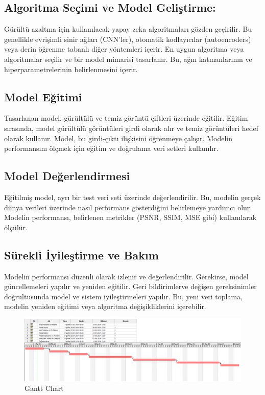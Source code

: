 \documentclass{article}
\begin{document}
\subsection{Algoritma Seçimi ve Model Geliştirme:}
Gürültü azaltma için kullanılacak yapay zeka algoritmaları gözden geçirilir. Bu genellikle evrişimli sinir ağları (CNN'ler), otomatik kodlayıcılar (autoencoders) veya derin öğrenme tabanlı diğer yöntemleri içerir.
En uygun algoritma veya algoritmalar seçilir ve bir model mimarisi tasarlanır. Bu, ağın katmanlarının ve hiperparametrelerinin belirlenmesini içerir.



\subsection{Model Eğitimi}
Tasarlanan model, gürültülü ve temiz görüntü çiftleri üzerinde eğitilir.
Eğitim sırasında, model gürültülü görüntüleri girdi olarak alır ve temiz görüntüleri hedef olarak kullanır. Model, bu girdi-çıktı ilişkisini öğrenmeye çalışır.
Modelin performansını ölçmek için eğitim ve doğrulama veri setleri kullanılır. 

\subsection{Model Değerlendirmesi}
Eğitilmiş model, ayrı bir test veri seti üzerinde değerlendirilir. Bu, modelin gerçek dünya verileri üzerinde nasıl performans gösterdiğini belirlemeye yardımcı olur.
Modelin performansı, belirlenen metrikler (PSNR, SSIM, MSE gibi) kullanılarak ölçülür.

\subsection{Sürekli İyileştirme ve Bakım}
Modelin performansı düzenli olarak izlenir ve değerlendirilir. Gerekirse, model güncellemeleri yapılır ve yeniden eğitilir.
Geri bildirimlerve değişen gereksinimler doğrultusunda model ve sistem iyileştirmeleri yapılır. Bu, yeni veri toplama, modelin yeniden eğitimi veya algoritma değişikliklerini içerebilir.

 \begin{landscape}
\thispagestyle{empty} %
    \begin{figure}
     \centering
  \includegraphics[angle=360,width=1.6\textwidth]{gantt_chart.png}\centering %
  \caption{Gantt Chart}
  \label{fig:resim_etiketi}
\end{figure}

\end{landscape}



\end{document}

